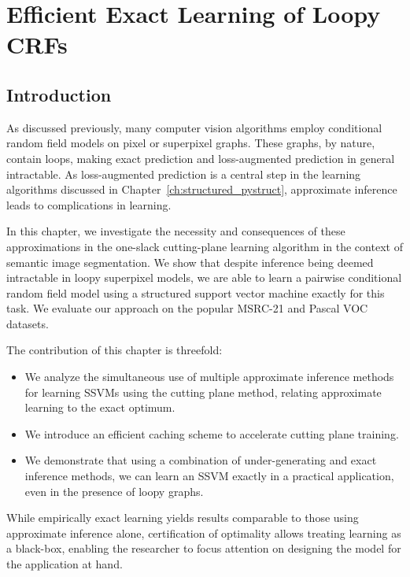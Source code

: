 \chapter{Efficient Exact Learning of Loopy CRFs}\label{ch:exact_learning}

\section{Introduction}
As discussed previously, %
many computer vision algorithms employ conditional random
field models on pixel or superpixel graphs. These graphs, by nature, contain loops,
making exact prediction and loss-augmented prediction in general intractable.
As loss-augmented prediction is a central step in the learning algorithms
discussed in Chapter~\ref{ch:structured_pystruct}, approximate inference leads
to complications in learning.

In this chapter, we investigate the necessity and consequences of these
approximations in the one-slack cutting-plane learning algorithm in the context of semantic
image segmentation. We show that despite inference being deemed intractable in
loopy superpixel models, we are able to learn a pairwise conditional random
field model using a structured support vector machine exactly for this task.
We evaluate our approach on the popular MSRC-21 and Pascal VOC datasets. %

The contribution of this chapter is threefold:
\begin{itemize}
    \item We analyze the simultaneous use of multiple approximate inference
        methods for learning SSVMs using the cutting plane method, relating
        approximate learning to the exact optimum. %
    \item We introduce an efficient caching scheme to accelerate cutting plane
        training.
    \item We demonstrate that using a combination of under-generating and exact
        inference methods, we can learn an SSVM exactly in a practical
        application, even in the presence of loopy graphs.
\end{itemize}

While empirically exact learning yields results comparable to those using
approximate inference alone, certification of optimality allows treating
learning as a black-box, enabling the researcher to focus attention on
designing the model for the application at hand.


